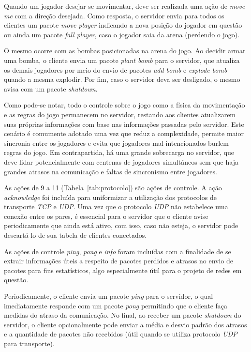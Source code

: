\documentclass[12pt]{article}
\begin{document}
Quando um jogador desejar se movimentar, deve ser realizada uma ação de \emph{move
me} com a direção desejada. Como resposta, o servidor envia para todos os
clientes um pacote \textit{move player} indicando a nova posição do jogador em
questão ou ainda um pacote \textit{fall player}, caso o jogador saia da arena
(perdendo o jogo).

O mesmo ocorre com as bombas posicionadas na arena do jogo. Ao decidir armar
uma bomba, o cliente envia um pacote \textit{plant bomb} para o servidor, que
atualiza os demais jogadores por meio do envio de pacotes \emph{add bomb} e \emph{explode
bomb} quando a mesma explodir. Por fim, caso o servidor deva ser desligado, o
mesmo avisa com um pacote \textit{shutdown}.

Como pode-se notar, todo o controle sobre o jogo como a física da movimentação
e as regras do jogo permanecem no servidor, restando aos clientes atualizarem
suas próprias informações com base nas informações passadas pelo servidor. Este
cenário é comumente adotado uma vez que reduz a complexidade, permite maior
sincronia entre os jogadores e evita que jogadores mal-intencionados burlem
regras do jogo. Em contrapartida, há uma grande sobrecarga no servidor, que
deve lidar potencialmente com centenas de jogadores simultâneos sem que haja
grandes atrasos na comunicação e faltas de sincronismo entre jogadores.

As ações de 9 a 11 (Tabela~\ref{tab:protocolo}) são ações de controle. A ação
\textit{acknowledge} foi incluída para uniformizar a utilização dos protocolos
de transporte \emph{TCP} e \emph{UDP}. Uma vez que o protocolo \emph{UDP} não estabelece uma
conexão entre os pares, é essencial para o servidor que o cliente avise
periodicamente que ainda está ativo, com isso, caso não esteja, o servidor pode
descartá-lo de sua tabela de clientes conectados.

As ações de controle \textit{ping}, \textit{pong} e \textit{info} foram
incluídas com a finalidade de se extrair informações úteis a respeito de
pacotes perdidos e atrasos no envio de pacotes para fins estatísticos, algo
especialmente útil para o projeto de redes em questão.

Periodicamente, o cliente envia um pacote \textit{ping} para o servidor, o qual
imediatamente responde com um pacote \textit{pong} permitindo que o cliente
faça medidas do atraso da comunicação. No final, ao receber um pacote
\textit{shutdown} do servidor, o cliente opcionalmente pode enviar a média e
desvio padrão dos atrasos e a quantidade de pacotes não recebidos (útil quando
se utiliza protocolo \emph{UDP} para transporte).
\end{document}
